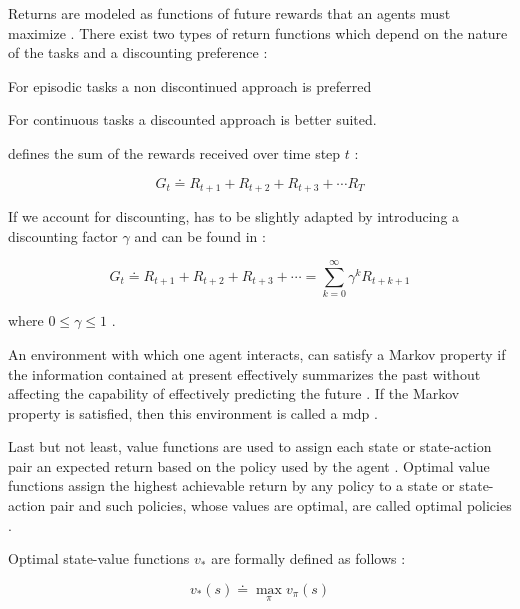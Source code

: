 \documentclass[draft=false]{seal_thesis}
\begin{document}
Returns are modeled as functions of future rewards that an agents must maximize \citep[p. 73]{Sutton2017}. There exist two types of return functions which depend on the nature of the tasks and a discounting preference \citep[p. 73]{Sutton2017}:
\begin{enumerate*}
	\item For episodic tasks a non discontinued approach is preferred
	\item For continuous tasks a discounted approach is better suited.
\end{enumerate*}

 defines the sum of the rewards received over time step $t$ \citep[p. 73]{Sutton2017}:

\begin{equation}
\label{eq:expected_return}
	G_t  \doteq R_{t+1} + R_{t+2} + R_{t+3} + \cdots R_{T}
\end{equation}

If we account for discounting,  has to be slightly adapted by introducing a discounting factor $\gamma$ and can be found in :

\begin{equation}
\label{eq:expected_discounted_return}
	G_t  \doteq R_{t+1} + R_{t+2} + R_{t+3} + \cdots = \sum_{k=0}^\infty \gamma^k R_{t+k+1}
\end{equation}

where $0 \leq \gamma \leq 1$ \citep[p. 73]{Sutton2017}.

An environment  with which one agent interacts, can satisfy a Markov property if the information contained at present effectively summarizes the past without affecting the capability of effectively predicting the future \citep[p. 73]{Sutton2017}. If the Markov property is satisfied, then this environment is called a \gls{mdp} \citep[p. 73]{Sutton2017}.

Last but not least, value functions are used to assign each state or state-action pair an expected return based on the policy used by the agent \citep[p. 74]{Sutton2017}. Optimal value functions assign the highest achievable return by any policy to a state or state-action pair  and such policies, whose values are optimal, are called optimal policies \citep[p. 74]{Sutton2017}.

Optimal state-value functions $v_*$ are formally defined as follows \citep[p. 74]{Sutton2017}:

\begin{equation}
	v_* (s) \doteq \max_\pi v_\pi (s)
\end{equation}
\end{document}
